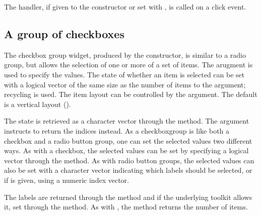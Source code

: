 The handler, if given to the constructor or set with , is called on a click event.

\subsection{A group of checkboxes}
\label{sec:gWidgets-group-checkboxes}


The checkbox group widget, produced by the
 constructor, is similar to a radio group,
but allows the selection of one or more of a set of items.  The
 arugment is used to specify the
values. The state of whether an item is selected can be set with a
logical vector of the same size as the number of items to the
 argument; recycling is used. The
item layout can be controlled by the
 argument. The default is a
vertical layout ().

The state is retrieved as a character vector through the
 method. The  argument
instructs  to return the indices instead. As a
checkboxgroup is like both a checkbox and a radio button group, one
can set the selected values two different ways. As with a checkbox, 
the selected values can be set by specifying a logical vector through the
 method. As with radio button groups,
the selected values can also be set with a character vector indicating
which labels should be selected, or if  is given,
using a numeric index vector.

The labels are returned through the \method{[}{gcheckboxgroup} method
and if the underlying toolkit allows it, set through the
\method{[\ASSIGN}{gcheckboxgroup} method. As with ,
the  method returns the number of items.

